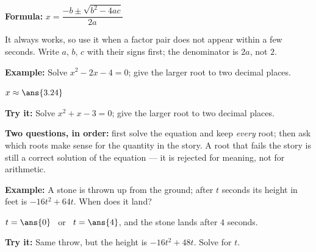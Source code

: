 \documentclass[12pt]{article}
\begin{document}

\begin{formulabox}
\textbf{Formula:} \quad $x = \dfrac{-b \pm \sqrt{b^2-4ac}}{2a}$\par\smallskip
It always works, so use it when a factor pair does not appear within a few seconds. Write $a$, $b$, $c$ with their signs first; the denominator is $2a$, not $2$.
\end{formulabox}

\begin{examplebox}
\textbf{Example:} \quad Solve $x^2 - 2x - 4 = 0$; give the larger root to two decimal places.
\par
$x \approx \ans{3.24}$
\end{examplebox}

\begin{tryitbox}
\textbf{Try it:} \quad Solve $x^2 + x - 3 = 0$; give the larger root to two decimal places.\\[2pt]
\end{tryitbox}


\begin{formulabox}
\textbf{Two questions, in order:} first solve the equation and keep \emph{every} root; then ask which roots make sense for the quantity in the story. A root that fails the story is still a correct solution of the equation --- it is rejected for meaning, not for arithmetic.
\end{formulabox}

\begin{examplebox}
\textbf{Example:} \quad A stone is thrown up from the ground; after $t$ seconds its height in feet is $-16t^2 + 64t$. When does it land?
\par
$t = \ans{0}$ \ or \ $t = \ans{4}$, and the stone lands after $4$ seconds.
\end{examplebox}

\begin{tryitbox}
\textbf{Try it:} \quad Same throw, but the height is $-16t^2 + 48t$. Solve for $t$.\\[2pt]
\end{tryitbox}
\end{document}
